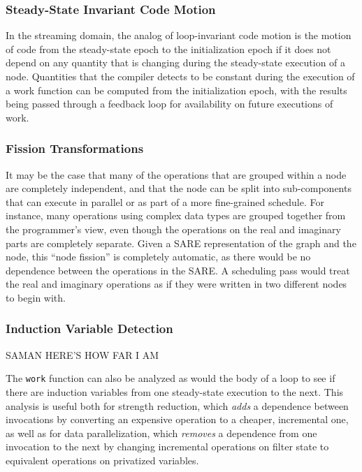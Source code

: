 \subsubsection{Steady-State Invariant Code Motion}

In the streaming domain, the analog of loop-invariant code motion is
the motion of code from the steady-state epoch to the initialization
epoch if it does not depend on any quantity that is changing during
the steady-state execution of a node.  Quantities that the compiler
detects to be constant during the execution of a work function can be
computed from the initialization epoch, with the results being passed
through a feedback loop for availability on future executions of work.

\subsubsection{Fission Transformations}

It may be the case that many of the operations that are grouped within
a node are completely independent, and that the node can be split into
sub-components that can execute in parallel or as part of a more
fine-grained schedule.  For instance, many operations using complex
data types are grouped together from the programmer's view, even
though the operations on the real and imaginary parts are completely
separate.  Given a SARE representation of the graph and the node, this
``node fission'' is completely automatic, as there would be no
dependence between the operations in the SARE.  A scheduling pass
would treat the real and imaginary operations as if they were written
in two different nodes to begin with.

\subsubsection{Induction Variable Detection}

SAMAN HERE'S HOW FAR I AM

The {\tt work} function can also be analyzed as would the body of a loop
to see if there are induction variables from one steady-state execution
to the next.  This analysis is useful both for strength reduction, which
{\it adds} a dependence between invocations by converting an expensive
operation to a cheaper, incremental one, as well as for data
parallelization, which {\it removes} a dependence from one invocation to
the next by changing incremental operations on filter state to
equivalent operations on privatized variables.

